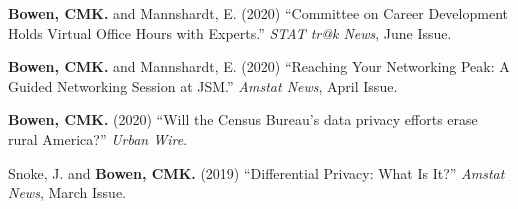 \documentclass[11pt, letterpaper, roman]{moderncv} %
\begin{document}
\begin{etaremune}[topsep=0pt, itemsep=4pt, partopsep=0pt, parsep=0pt]
    \item \textbf{Bowen, CMK.} and Mannshardt, E. (2020) ``Committee on Career Development Holds Virtual Office Hours with Experts.'' \textit{STAT tr@k News}, June Issue.

    \item \textbf{Bowen, CMK.} and Mannshardt, E. (2020) ``Reaching Your Networking Peak: A Guided Networking Session at JSM.'' \textit{Amstat News}, April Issue.
    
    \item \textbf{Bowen, CMK.} (2020) ``Will the Census Bureau's data privacy efforts erase rural America?'' \textit{Urban Wire}. 
    
    \item Snoke, J. and \textbf{Bowen, CMK.} (2019) ``Differential Privacy: What Is It?'' \textit{Amstat News}, March Issue.
\end{etaremune}

\newpage
\end{document}
